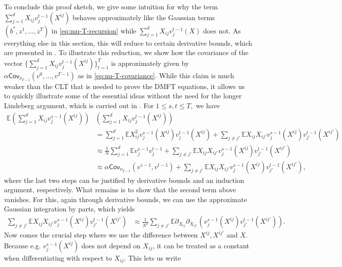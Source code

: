 \documentclass{article}
\newcommand{\1}{\mathbbm{1}}
\theoremstyle{plain}
\theoremstyle{definition}
\theoremstyle{remark}
\newcommand{\E}{\mathbb{E}}
\newcommand{\Cov}{\mathsf{Cov}}
\begin{document}
To conclude this proof sketch, we give some intuition for why the term $\sum_{j=1}^d X_{ij}v_j^{t-1}(X^{ij})$ behaves approximately like the Gaussian terms $(b^*,z^1,\dots,z^T)$ in \eqref{eq:mu-T-recursion} while $\sum_{j=1}^d X_{ij}v_j^{t-1}(X)$ does not. As everything else in this section, this will reduce to certain derivative bounds, which are presented in . To illustrate this reduction, we show how the covariance of the vector $\{\sum_{j=1}^d X_{ij}v_j^{t-1}(X^{ij})\}_{t=1}^T$ is approximately given by $\alpha \Cov_{\nu_{T-1}}(v^0,\dots,v^{T-1})$ as in \eqref{eq:nu-T-covariance}. While this claim is much weaker than the CLT that is needed to prove the DMFT equations, it allows us to quickly illustrate some of the essential ideas without the need for the longer Lindeberg argument, which is carried out in .
For $1\leq s,t\leq T,$ we have
\begin{align*}
    \E \left(\sum_{j=1}^d X_{ij}v_j^{s-1}(X^{ij})\right)&\left(\sum_{j=1}^d X_{ij}v_j^{t-1}(X^{ij})\right) \\
    &= \sum_{j=1}^d \E X_{ij}^2 v_j^{s-1}(X^{ij})v_j^{t-1}(X^{ij})  + \sum_{j\neq j'}\E X_{ij}X_{ij'} v_j^{s-1}(X^{ij})v_{j'}^{t-1}(X^{ij'}) \\
    &\approx \frac{1}{N} \sum_{j=1}^d \E  v_j^{s-1}v_j^{t-1}  + \sum_{j\neq j'}\E X_{ij}X_{ij'} v_j^{s-1}(X^{ij})v_{j'}^{t-1}(X^{ij'}) \\
    &\approx \alpha  \Cov_{\nu_{T-1}}(v^{s-1},v^{t-1})+ \sum_{j\neq j'}\E X_{ij}X_{ij'} v_j^{s-1}(X^{ij})v_{j'}^{t-1}(X^{ij'}),
\end{align*}
where the last two steps can be justified by derivative bounds and an induction argument, respectively. What remains is to show that the second term above vanishes. For this, again through derivative bounds, we can use the approximate Gaussian integration by parts, which yields
\begin{align*}
     \sum_{j\neq j'}\E X_{ij}X_{ij'} v_j^{s-1}(X^{ij})v_{j'}^{t-1}(X^{ij'}) &\approx \frac{1}{N^2}\sum_{j\neq j'}\E\partial_{X_{ij}}\partial_{X_{ij'}} (v_j^{s-1}(X^{ij})v_{j'}^{t-1}(X^{ij'})).
\end{align*}
Now comes the crucial step where we use the difference between $X^{ij}, X^{ij'}$ and $X.$ Because e.g. $v_j^{s-1}(X^{ij})$ does not depend on $X_{ij}$, it can be treated as a constant when differentiating with respect to $X_{ij}.$ This lets us write
\end{document}
